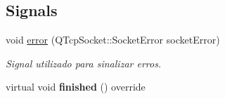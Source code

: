 \subsection*{Signals}
\begin{DoxyCompactItemize}
\item 
void \hyperlink{classWorkerThreadImpl_ae260562530b71dc55a6d360d5e4d896d}{error} (Q\+Tcp\+Socket\+::\+Socket\+Error socket\+Error)
\begin{DoxyCompactList}\small\item\em Signal utilizado para sinalizar erros. \end{DoxyCompactList}\item 
virtual void {\bfseries finished} () override\hypertarget{classWorkerThreadImpl_aca36cb83741dce52b5d92cc7a2844257}{}\label{classWorkerThreadImpl_aca36cb83741dce52b5d92cc7a2844257}

\end{DoxyCompactItemize}
